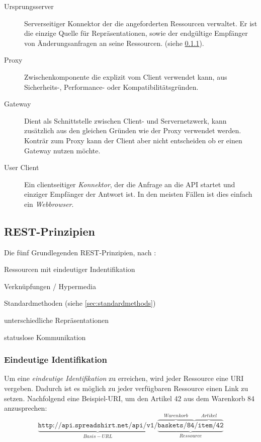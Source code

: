 \begin{description}
    \item[Ursprungsserver] 
        Serverseitiger Konnektor der die angeforderten Ressourcen verwaltet. Er ist die einzige Quelle für Repräsentationen, sowie der endgültige Empfänger von Änderungsanfragen an seine Ressourcen. (siehe \cref{sec:unambigiousidentification}).
    \item[Proxy] Zwischenkomponente die explizit vom Client verwendet kann, aus Sicherheits-, Performance- oder Kompatibilitätsgründen.
    \item[Gateway] Dient als Schnittstelle zwischen Client- und Servernetzwerk, kann zusätzlich aus den gleichen Gründen wie der Proxy verwendet werden. Konträr zum Proxy kann der Client aber nicht entscheiden ob er einen Gateway nutzen möchte.
    \item[User Client] 
        Ein clientseitiger \emph{Konnektor}, der die Anfrage an die API startet und einziger Empfänger der Antwort ist. In den meisten Fällen ist dies einfach ein \emph{Webbrowser}.
\end{description}

\subsection{REST-Prinzipien}

Die fünf Grundlegenden REST-Prinzipien, nach \cite[11 ff.]{Tilkov09}:
\begin{compactitem}
    \item Ressourcen mit eindeutiger Indentifikation
    \item Verknüpfungen / Hypermedia
    \item Standardmethoden (siehe \cref{sec:standardmethods})
    \item unterschiedliche Repräsentationen
    \item statuslose Kommunikation
\end{compactitem}

\subsubsection{Eindeutige Identifikation}
\label{sec:unambigiousidentification}

Um eine \emph{eindeutige Identifikation} zu erreichen, wird jeder Ressource eine \gls{URI} vergeben. Dadurch ist es möglich zu jeder verfügbaren Ressource einen Link zu setzen. 
Nachfolgend eine Beispiel-URI, um den Artikel 42 aus dem Warenkorb 84 anzusprechen:
\[
    \underbrace{\texttt{http://api.spreadshirt.net/api/v1/}}_{Basis-URL}\underbrace{\overbrace{\texttt{baskets/84}}^{Warenkorb}\overbrace{\texttt{/item/42}}^{Artikel}}_{Ressource}
    \label{RESTexampleURL}
\]

